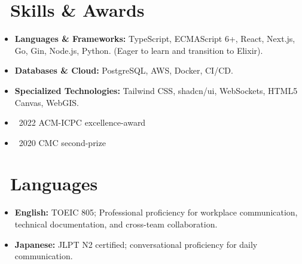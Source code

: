 \documentclass{resume}
\begin{document}
\section{\faCogs\ Skills \& Awards}
\begin{itemize}[parsep=0.5ex]
  \item \textbf{Languages \& Frameworks:} TypeScript, ECMAScript 6+, React, Next.js, Go, Gin, Node.js, Python. (Eager to learn and transition to Elixir).
  \item \textbf{Databases \& Cloud:} PostgreSQL, AWS, Docker, CI/CD.
  \item \textbf{Specialized Technologies:} Tailwind CSS, shadcn/ui, WebSockets, HTML5 Canvas, WebGIS.
  \item {} \textbullet\ 2022 ACM-ICPC excellence-award
  \item {} \textbullet\ 2020 CMC second-prize
\end{itemize}

\section{\faGlobe\ Languages}
\begin{itemize}[parsep=0.5ex]
  \item \textbf{English:} TOEIC 805; Professional proficiency for workplace communication, technical documentation, and cross-team collaboration.
  \item \textbf{Japanese:} JLPT N2 certified; conversational proficiency for daily communication.
\end{itemize}
\end{document}
